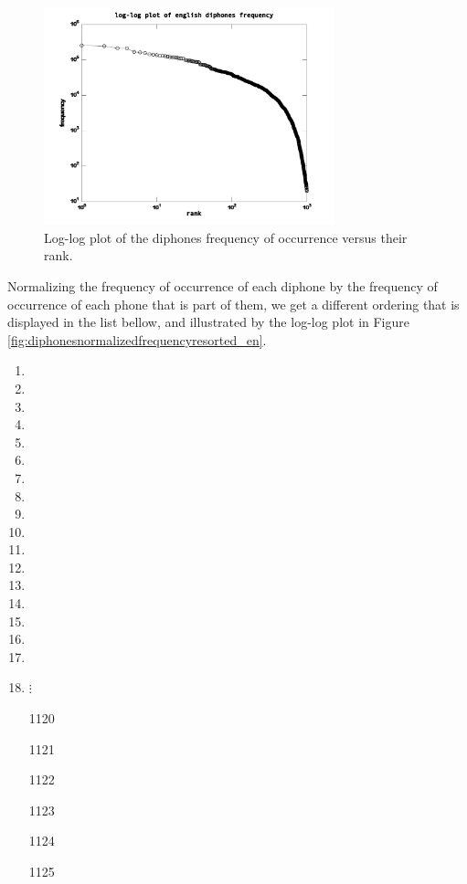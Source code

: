 \begin{figure}[h!]
\centering
\includegraphics[width=0.75\textwidth]{images/diphonesfrequency_en.pdf}
\caption{Log-log plot of the diphones frequency of occurrence versus their rank.}
\label{fig:diphonesfrequency_en}
\end{figure} 




Normalizing the frequency of occurrence of each diphone by the frequency of occurrence of each phone that is part of them, we get a different ordering that is displayed in the list bellow, and illustrated by the log-log plot in Figure \ref{fig:diphonesnormalizedfrequencyresorted_en}.

\begin{tiny}
\begin{multicols}{6}
\begin{enumerate}
    \item {}
    \item {}
    \item {}
    \item {} 
    \item {}
    \item {}
    \item {}
    \item {}
    \item {} 
    \item {}
    \item {}
    \item {}
    \item {}
    \item {}
    \item {} 
    \item {}
    \item {}
    \item $\vdots$
	\item[1120] 
	\item[1121] 
	\item[1122] 
	\item[1123] 
	\item[1124] 
	\item[1125] 
\end{enumerate}
\end{multicols}
\end{tiny}


